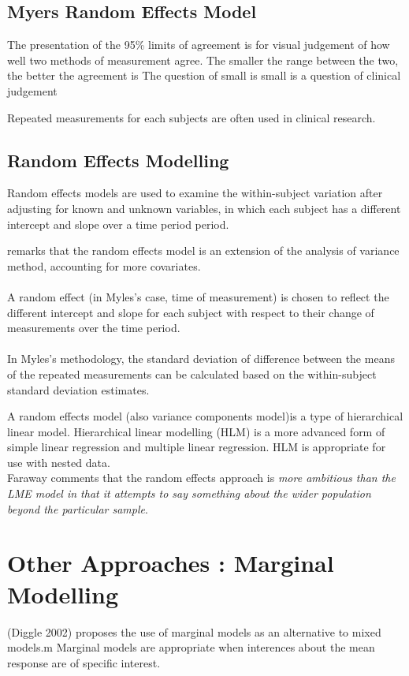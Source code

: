 \documentclass[12pt, a4paper]{report}
\theoremstyle{plain}
\theoremstyle{definition}
\theoremstyle{remark}
\begin{document}
\subsection{Myers Random Effects Model} The presentation of the
95\% limits of agreement is for visual judgement of how well two
methods of measurement agree. The smaller the range between the
two, the better the agreement is The question of small is small is
a question of clinical judgement


Repeated measurements for each subjects are often used in clinical
research.



\subsection{Random Effects Modelling}
Random effects models are used to examine the within-subject
variation after adjusting for known and unknown variables, in
which each subject has a different intercept and slope over a time
period period.


\citet{Myles} remarks that the random effects model is an
extension of the analysis of variance method, accounting for more
covariates.
\\
\\
A random effect (in Myles's case, time of measurement) is chosen
to reflect the different intercept and slope for each subject with
respect to their change of measurements over the time period.
\\
\\
In Myles's methodology, the standard deviation of difference
between the means of the repeated measurements can be calculated
based on the within-subject standard deviation estimates.

A random effects model (also variance components model)is a type
of hierarchical linear model. Hierarchical linear modelling (HLM)
is a more advanced form of simple linear regression and multiple
linear regression. HLM is appropriate for use with nested
data.\\Faraway comments that the random effects approach is
\emph{more ambitious than the LME model in that it attempts to say
	something about the wider population beyond the particular
	sample}.

\section{Other Approaches : Marginal Modelling}
(Diggle 2002) proposes the use of marginal models as an
alternative to mixed models.m Marginal models are appropriate when
interences about the mean response are of specific interest.
\end{document}
